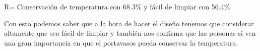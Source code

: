 
R= Conservación de temperatura con 68.3\% y fácil de limpiar con 56.4\%

Con esto podemos saber que a la hora de hacer el diseño tenemos que considerar altamente que sea fácil de limpiar y también nos confirma que las personas si ven una gran importancia en que el portavasos pueda conservar la temperatura.
